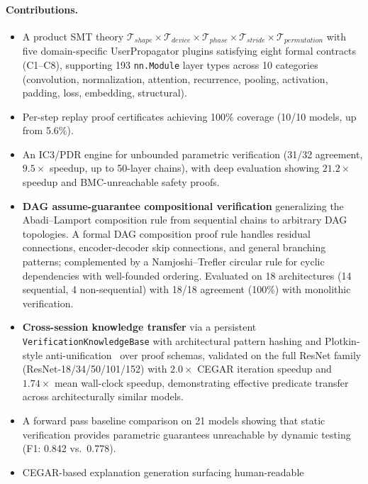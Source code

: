 \documentclass[11pt]{article}
\begin{document}
\paragraph{Contributions.}
\begin{itemize}[leftmargin=2em]
  \item A product SMT theory
    $\mathcal{T}_{\mathit{shape}} \times \mathcal{T}_{\mathit{device}}
    \times \mathcal{T}_{\mathit{phase}} \times \mathcal{T}_{\mathit{stride}}
    \times \mathcal{T}_{\mathit{permutation}}$ with five domain-specific
    UserPropagator plugins satisfying eight formal contracts (C1--C8),
    supporting 193 \texttt{nn.Module} layer types across 10 categories
    (convolution, normalization, attention, recurrence, pooling,
    activation, padding, loss, embedding, structural).
  \item Per-step replay proof certificates achieving 100\% coverage
    (10/10 models, up from 5.6\%).
  \item An IC3/PDR engine for unbounded parametric verification
    (31/32 agreement, $9.5\times$ speedup, up to 50-layer chains),
    with deep evaluation showing $21.2\times$ speedup and
    BMC-unreachable safety proofs.
  \item \textbf{DAG assume-guarantee compositional verification}
    generalizing the Abadi--Lamport composition rule from sequential
    chains to arbitrary DAG topologies.  A formal DAG composition proof
    rule handles residual connections, encoder-decoder skip connections,
    and general branching patterns; complemented by a Namjoshi--Trefler
    circular rule for cyclic dependencies with well-founded ordering.
    Evaluated on
    18 architectures (14 sequential, 4 non-sequential) with 18/18
    agreement (100\%) with monolithic verification.
  \item \textbf{Cross-session knowledge transfer} via a persistent
    \texttt{VerificationKnowledgeBase} with architectural pattern hashing
    and Plotkin-style anti-unification~\cite{plotkin70} over proof schemas,
    validated on the full ResNet family (ResNet-18/34/50/101/152) with
    $2.0\times$ CEGAR iteration speedup and $1.74\times$ mean wall-clock
    speedup, demonstrating effective predicate transfer across
    architecturally similar models.
  \item A forward pass baseline comparison on 21 models showing that
    static verification provides parametric guarantees unreachable by
    dynamic testing (F1: 0.842 vs.\ 0.778).
  \item CEGAR-based explanation generation surfacing human-readable

\end{itemize}
\end{document}
